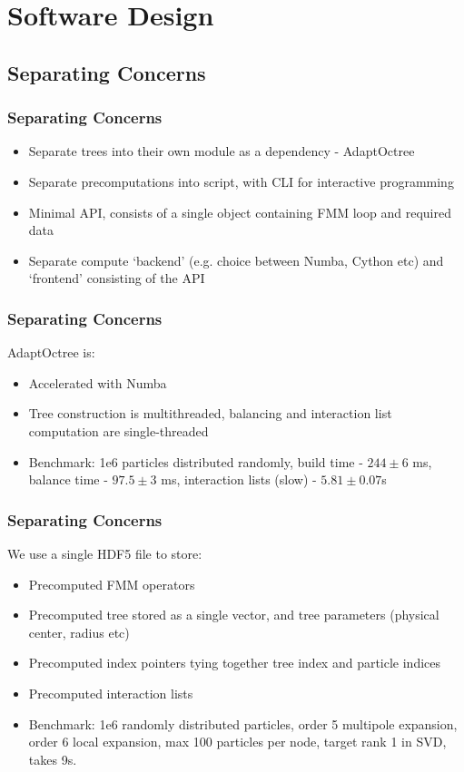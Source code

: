 \section{Software Design}

\subsection{Separating Concerns}

\begin{frame}
    \frametitle{Separating Concerns}
    \begin{itemize}
        \item Separate trees into their own module as a dependency - AdaptOctree
        \item Separate precomputations into script, with CLI for interactive programming
        \item Minimal API, consists of a single object containing FMM loop and required data
        \item Separate compute `backend' (e.g. choice between Numba, Cython etc) and `frontend' consisting of the API
    \end{itemize}
\end{frame}


\begin{frame}
    \frametitle{Separating Concerns}
    AdaptOctree is:
    \begin{itemize}
        \item Accelerated with Numba
        \item Tree construction is multithreaded, balancing and interaction list computation are single-threaded
        \item Benchmark: 1e6 particles distributed randomly, build time - $244 \pm 6$ ms, balance time - $97.5 \pm 3$ ms, interaction lists (slow) - $5.81 \pm 0.07$s
    \end{itemize}
\end{frame}

\begin{frame}
    \frametitle{Separating Concerns}
    We use a single HDF5 file to store:
    \begin{itemize}
        \item Precomputed FMM operators
        \item Precomputed tree stored as a single vector, and tree parameters (physical center, radius etc)
        \item Precomputed index pointers tying together tree index and particle indices
        \item Precomputed interaction lists
        \item Benchmark: 1e6 randomly distributed particles, order 5 multipole expansion, order 6 local expansion, max 100 particles per node, target rank 1 in SVD, takes 9s.
    \end{itemize}
\end{frame}

